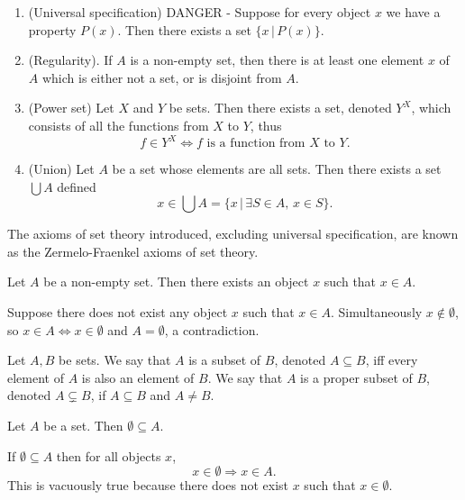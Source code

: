\documentclass{article}
\begin{document}
\begin{definition}
\begin{enumerate}
		\item (Universal specification) DANGER - Suppose for every object \(x\) we have a property \(P(x)\). Then there exists a set \(\{x\,|\,P(x)\}\).
		\item (Regularity). If \(A\) is a non-empty set, then there is at least one element \(x\) of \(A\) which is either not a set, or is disjoint from \(A\).
		\item (Power set) Let \(X\) and \(Y\) be sets. Then there exists a set, denoted \(Y^X\), which consists of all the functions from \(X\) to \(Y\), thus
			\begin{equation*}
				f\in Y^X\Leftrightarrow f\text{ is a function from } X\text{ to }Y.
			\end{equation*}
		\item (Union) Let \(A\) be a set whose elements are all sets. Then there exists a set \(\bigcup A\) defined
			\begin{equation*}
				x\in\bigcup A=\{x\,|\,\exists S\in A,\,x\in S\}.
			\end{equation*}
	\end{enumerate}
\end{definition}
\begin{remark}
	The axioms of set theory introduced, excluding universal specification, are known as the Zermelo-Fraenkel axioms of set theory.
\end{remark}
\begin{lemma}
\label{singlechoice}
	Let \(A\) be a non-empty set. Then there exists an object \(x\) such that \(x\in A\).
	\begin{IEEEproof}
		Suppose there does not exist any object \(x\) such that \(x\in A\). Simultaneously \(x\notin\emptyset\), so \(x\in A\Leftrightarrow x\in\emptyset\) and \(A=\emptyset\), a contradiction.
	\end{IEEEproof}
\end{lemma}
\begin{definition}[Subset]
	Let \(A,B\) be sets. We say that \(A\) is a subset of \(B\), denoted \(A\subseteq B\), iff every element of \(A\) is also an element of \(B\). We say that \(A\) is a proper subset of \(B\), denoted \(A\subsetneq B\), if \(A\subseteq B\) and \(A\neq B\).
\end{definition}
\begin{theorem}
	Let \(A\) be a set. Then \(\emptyset\subseteq A\).
	\begin{IEEEproof}
		If \(\emptyset\subseteq A\) then for all objects \(x\),
		\begin{equation*}
			x\in\emptyset\Rightarrow x\in A.
		\end{equation*}
		This is vacuously true because there does not exist \(x\) such that \(x\in\emptyset\).
	\end{IEEEproof}
\end{theorem}
\end{document}

